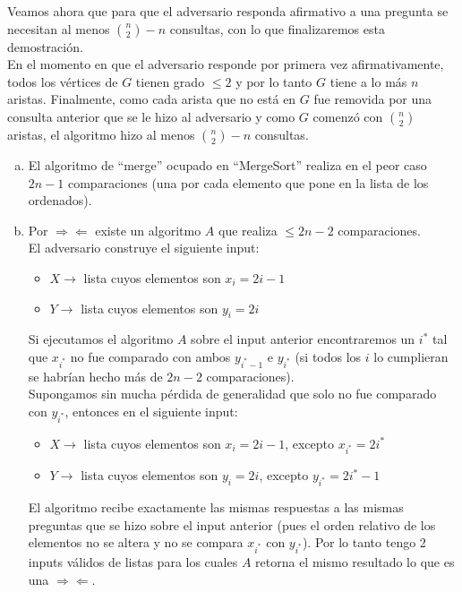 \documentclass[dcc,uchile]{fcfmcourse}
\theoremstyle{plain}
\theoremstyle{definition}
\begin{document}
\begin{problems}
Veamos ahora que para que el adversario responda afirmativo a una pregunta se necesitan al menos $\binom{n}{2}-n$ consultas, con lo que finalizaremos esta demostración.\\

En el momento en que el adversario responde por primera vez afirmativamente, todos los vértices de $G$ tienen grado $\le 2$ y por lo tanto $G$ tiene a lo más $n$ aristas. Finalmente, como cada arista que no está en $G$ fue removida por una consulta anterior que se le hizo al adversario y como $G$ comenzó con $\binom{n}{2}$ aristas, el algoritmo hizo al menos $\binom{n}{2}-n$ consultas.

\begin{enumerate}[a)]
    \item El algoritmo de ``merge'' ocupado en ``MergeSort'' realiza en el peor caso $2n-1$ comparaciones (una por cada elemento que pone en la lista de los ordenados). \flash
    
    \item Por $\Rightarrow \Leftarrow$ existe un algoritmo $A$ que realiza $\le 2n-2$  comparaciones.\\
    
    El adversario \demon  construye el siguiente input:
    \begin{itemize}
        \item $X \rightarrow$ lista cuyos elementos son $x_{i} = 2i-1$
        \item $Y \rightarrow$ lista cuyos elementos son $y_{i} = 2i$
    \end{itemize}
    
    Si ejecutamos el algoritmo $A$ sobre el input anterior encontraremos un $i^*$ tal que $x_{i^*}$ no fue comparado con ambos $y_{i^*-1}$ e $y_{i^*}$ (si todos los $i$ lo cumplieran se habrían hecho más de $2n-2$ comparaciones).\\
    Supongamos sin mucha pérdida de generalidad que solo no fue comparado con $y_{i^*}$, entonces en el siguiente input:
    \begin{itemize}
        \item $X \rightarrow$ lista cuyos elementos son $x_{i} = 2i-1$, excepto $x_{i^*} = 2i^*$
        \item $Y \rightarrow$ lista cuyos elementos son $y_{i} = 2i$, excepto $y_{i^*} = 2i^*-1$
    \end{itemize}
    El algoritmo recibe exactamente las mismas respuestas a las mismas preguntas que se hizo sobre el input anterior (pues el orden relativo de los elementos no se altera y no se compara $x_{i^*}$ con $y_{i^*}$). Por lo tanto tengo 2 inputs válidos de listas para los cuales $A$ retorna el mismo resultado lo que es una $\Rightarrow \Leftarrow$.
\end{enumerate}
\end{problems}
\end{document}
